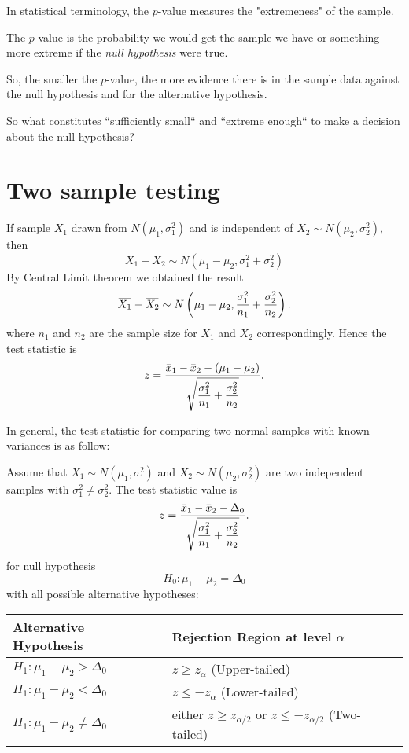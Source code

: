 In statistical terminology, the $p$-value measures the "extremeness" of the sample.

\begin{definition}[p-value]
    The $p$-value is the probability we would get the sample we have or something 
    more extreme if the \textit{null hypothesis} were true.
\end{definition}

So, the smaller the $p$-value, the more evidence there is in 
the sample data against the null hypothesis and for the 
alternative hypothesis. 

So what constitutes ``sufficiently small`` and ``extreme 
enough`` to make a decision about the null hypothesis?

\section{Two sample testing}

If sample $X_1$ drawn from $N(\mu_1, \sigma^2_1)$ and is independent of 
$X_2 \sim N(\mu_2, \sigma^2_2)$, then 
\[
    X_1 - X_2 \sim N(\mu_1 - \mu_2, \sigma^2_1 + \sigma^2_2)
\]
By Central Limit theorem we obtained the result
\[
    \ols{X_1} - \ols{X_2} \sim N \left( \mu_1 - \mu_2, \frac{\sigma_1^2}{n_1} + \frac{\sigma_2^2}{n_2} \right).
\]
where $n_1$ and $n_2$ are the sample size for $X_1$ and $X_2$ correspondingly. 
Hence the test statistic is 
\begin{equation}
    z = \frac{\ols{x}_1 - \ols{x}_2 - (\mu_1 - \mu_2)}{\sqrt{\displaystyle \frac{\sigma_1^2}{n_1} + \frac{\sigma_2^2}{n_2}}}.
\end{equation}

In general, the test statistic for comparing two normal samples with known variances is as follow:
\begin{definition}
    Assume that $X_1 \sim N(\mu_1, \sigma^2_1)$ and $X_2 \sim N(\mu_2, \sigma^2_2)$ are two independent samples with 
    $\sigma^2_1 \neq \sigma^2_2$. The test statistic value is
    \begin{equation}
    z = \frac{\ols{x}_1 - \ols{x}_2 - \Delta_0}{\sqrt{\displaystyle \frac{\sigma_1^2}{n_1} + \frac{\sigma_2^2}{n_2}}}.
    \end{equation}
    for null hypothesis
    \[
        H_0 : \mu_1 - \mu_2 = \Delta_0
    \]
    with all possible alternative hypotheses:

    \renewcommand{\arraystretch}{1.2}
    \begin{tabularx}{\textwidth}{|l|X|}
    \hline
    Alternative Hypothesis & Rejection Region at level $\alpha$\\
    \hline
    $H_1 : \mu_1 - \mu_2 > \Delta_0$ & $z \geq z_\alpha$ (Upper-tailed)\\
    \hline
    $H_1 : \mu_1 - \mu_2 < \Delta_0$ & $z \leq -z_\alpha$ (Lower-tailed)\\
    \hline
    $H_1 : \mu_1 - \mu_2 \neq \Delta_0$ & either $z \geq z_{\alpha/2}$ or $z \leq -z_{\alpha/2}$ (Two-tailed)\\
    \hline
    \end{tabularx}
\end{definition}


